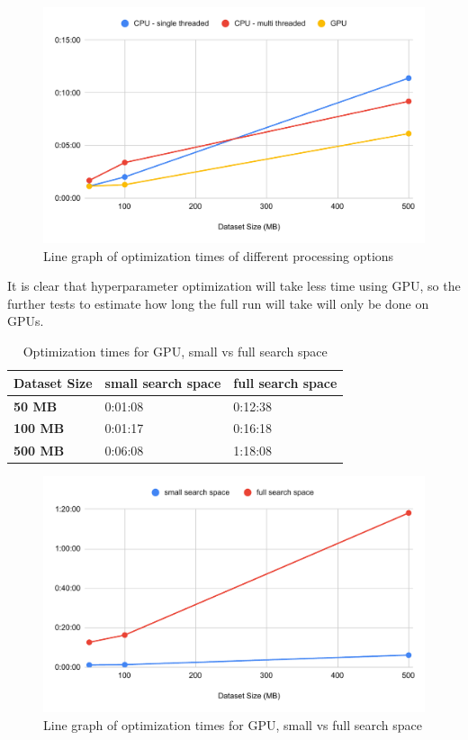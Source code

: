\documentclass[12pt,twoside]{report}
\begin{document}
\begin{figure}[h]
\centering
\includegraphics[width = 0.8\hsize]{figures/efficiency/cpu-gpu.pdf}
\caption{Line graph of optimization times of different processing options}
\label{fig:cpu-gpu}
\end{figure}

It is clear that hyperparameter optimization will take less time using GPU, so the further tests to estimate how long the full run will take will only be done on GPUs.

\begin{table}[h]
\centering
\begin{tabular}{|l|l|l|}
\hline
\textbf{Dataset Size} & \textbf{small search space} & \textbf{full search space} \\ \hline
\textbf{50 MB}        & 0:01:08                     & 0:12:38                    \\ \hline
\textbf{100 MB}       & 0:01:17                     & 0:16:18                    \\ \hline
\textbf{500 MB}       & 0:06:08                     & 1:18:08                    \\ \hline
\end{tabular}
\caption{Optimization times for GPU, small vs full search space}
\label{tab:gpu-search-spaces}
\end{table}

\begin{figure}[H]
\centering
\includegraphics[width = 0.8\hsize]{figures/efficiency/gpu.pdf}
\caption{Line graph of optimization times for GPU, small vs full search space}
\label{fig:gpu}
\end{figure}
\end{document}
